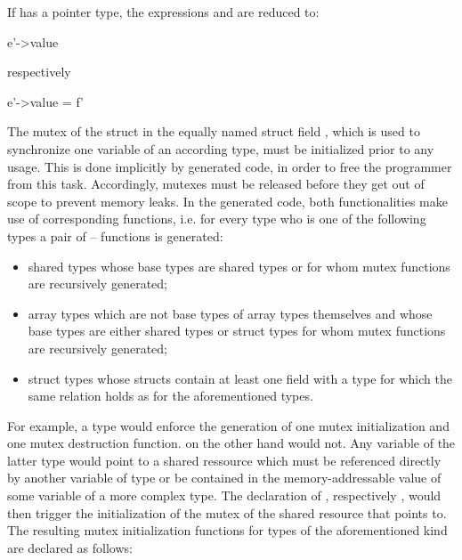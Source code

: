 If  has a pointer type, the expressions  and  are reduced to:

\vspace{4mm}
\begin{minipage}{1\textwidth}
\begin{minipage}{0.1\textwidth}
\begin{ccode}{}
e'->value
\end{ccode}
\end{minipage}
\begin{minipage}{0.22\textwidth}
\qquad respectively
\end{minipage}
\begin{minipage}{0.15\textwidth}
\begin{ccode}{}
e'->value = f'
\end{ccode}
\end{minipage}
\end{minipage}
\vspace{0mm}

The mutex of the struct  in the equally named struct field , which is used to synchronize one variable of an according type, must be initialized prior to any usage. This is done implicitly by generated code, in order to free the programmer from this task. Accordingly, mutexes must be released before they get out of scope to prevent memory leaks. In the generated code, both functionalities make use of corresponding functions, i.e. for every type who is one of the following types a pair of -- functions is generated:

\begin{itemize}
\item shared types whose base types are shared types or for whom mutex functions are recursively generated;
\item array types which are not base types of array types themselves and whose base types are either shared types or struct types for whom mutex functions are recursively generated;
\item struct types whose structs contain at least one field with a type for which the same relation holds as for the aforementioned types.
\end{itemize}

For example, a type  would enforce the generation of one mutex initialization and one mutex destruction function.  on the other hand would not. Any variable  of the latter type would point to a shared ressource which must be referenced directly by another variable  of type  or be contained in the memory-addressable value of some variable  of a more complex type. The declaration of , respectively , would then trigger the initialization of the mutex of the shared resource that  points to. The resulting mutex initialization functions for types of the aforementioned kind are declared as follows:

